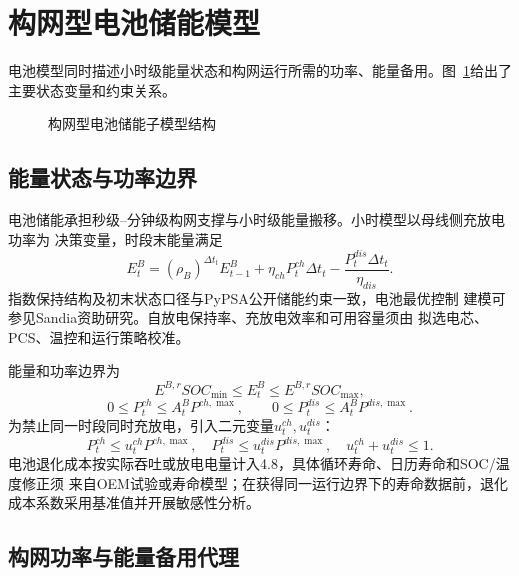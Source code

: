 \section{构网型电池储能模型}
\label{sec:battery}

电池模型同时描述小时级能量状态和构网运行所需的功率、能量备用。图~\ref{fig:battery-model}给出了主要状态变量和约束关系。
\begin{figure}[H]
\centering
\resizebox{0.88\textwidth}{!}{}
\caption{构网型电池储能子模型结构}
\label{fig:battery-model}
\end{figure}

\subsection{能量状态与功率边界}

电池储能承担秒级--分钟级构网支撑与小时级能量搬移。小时模型以母线侧充放电功率为
决策变量，时段末能量满足
\begin{equation}
E_t^B=(\rho_B)^{\Delta t_t}E_{t-1}^B
+\eta_{ch}P_t^{ch}\Delta t_t
-\frac{P_t^{dis}\Delta t_t}{\eta_{dis}}.
\label{eq:bess-state}
\end{equation}
指数保持结构及初末状态口径与PyPSA公开储能约束一致\cite{pypsa-storage}，电池最优控制
建模可参见Sandia资助研究\cite{sandia-bess}。自放电保持率、充放电效率和可用容量须由
拟选电芯、PCS、温控和运行策略校准。

能量和功率边界为
\begin{equation}
E^{B,r}SOC_{\min}\le E_t^B\le E^{B,r}SOC_{\max},
\label{eq:bess-soc}
\end{equation}
\begin{equation}
0\le P_t^{ch}\le A_t^BP^{ch,\max},\qquad
0\le P_t^{dis}\le A_t^BP^{dis,\max}.
\label{eq:bess-power}
\end{equation}
为禁止同一时段同时充放电，引入二元变量$u_t^{ch},u_t^{dis}$：
\begin{equation}
P_t^{ch}\le u_t^{ch}P^{ch,\max},\quad
P_t^{dis}\le u_t^{dis}P^{dis,\max},\quad
u_t^{ch}+u_t^{dis}\le1.
\label{eq:bess-exclusive}
\end{equation}
电池退化成本按实际吞吐或放电电量计入4.8，具体循环寿命、日历寿命和SOC/温度修正须
来自OEM试验或寿命模型；在获得同一运行边界下的寿命数据前，退化成本系数采用基准值并开展敏感性分析。

\subsection{构网功率与能量备用代理}

